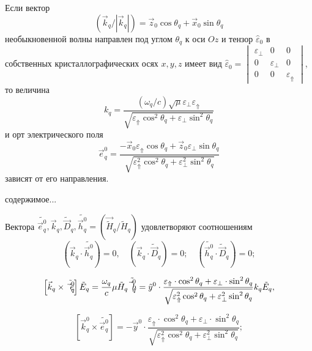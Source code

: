 \documentclass[a4paper]{article}
\begin{document}
 	\begin{minipage}{0.5\textwidth}
 		\begin{flushleft}
 			Если вектор 
 			$$\left(\vec{k}_{q}/\left|\vec{k}_{q}\right|\right)=\vec{z}_{0}\cos\theta_{q}+\vec{x}_{0}\sin\theta_{q}$$
 			необыкновенной волны направлен под углом $\theta_{q}$ к оси  $Oz$  и тензор $\hat{\varepsilon}_{0}$ в собственных кристаллографических осях  $x, y, z$ имеет вид 
 			$\hat{\varepsilon}_{0}=
 			\begin{vmatrix}
 				 \varepsilon_{\perp}& 0& 0\\
 				0& \varepsilon_{\perp}& 0\\
 				0& 0& \varepsilon_{\Uparrow}
 			\end{vmatrix}$, то величина
 		$$k_{q}=\frac{(\omega_{q}/c)\sqrt\mu\varepsilon_{\perp}\varepsilon_{\Uparrow}}{\sqrt{\varepsilon_{\Uparrow}\cos^{2}\theta_{q}+\varepsilon_{\perp}\sin^{2}\theta_{q}}}$$ и орт электрического поля $$\vec{e}_{q}^{0}=\frac{-\vec{x}_{0}\varepsilon_{\Uparrow}\cos\theta_{q}+\vec{z}_{0}\varepsilon_{\perp}\sin\theta_{q}}{\sqrt{\varepsilon_{\Uparrow}^{2}\cos^{2}\theta_{q}+\varepsilon_{\perp}^{2}\sin^{2}\theta_{q}}}$$ зависят от его направления.
 		\end{flushleft}
 	\end{minipage}
 	\begin{minipage}{0.5\textwidth}
 		\begin{flushright}
 			содержимое...
 		\end{flushright}
 	\end{minipage}
 	
 	Вектора $\tilde{\vec{e}^{0}_{q}},	 \vec{k}_{q},\tilde{\vec{D}}_{q},   \tilde{\vec{h}^{0}_{q}}=(\vec{\tilde{H}}_{q}/\tilde{H}_{q})$ удовлетворяют соотношениям 
 	$$\left(\vec{k}_{q}\cdot\tilde{\vec{h}^{0}_{q}}\right)=0,\quad\left(\vec{k}_{q}\cdot\tilde{\vec{D}}_{q}\right)=0;\quad\left(\tilde{\vec{h}^{0}_{q}}\cdot\tilde{\vec{D}}_{q}\right)=0;$$
 	
 	$$\left[\vec{k}_{q}\times\tilde{\vec{e}^{0}_{q}}\right]\tilde{E}_{q}=\frac{\omega_{q}}{c}\mu\tilde{H}_{q}\tilde{\vec{h}^{0}_{q}}=\-\tilde{y}^{0}\cdot\frac{\varepsilon_{\Uparrow}\cdot\cos^{2}\theta_{q}+\varepsilon_{\perp}\cdot\sin^{2}\theta_{q}}{\sqrt{\varepsilon_{\Uparrow}^{2}\cos^{2}\theta_{q}+\varepsilon_{\perp}^{2}\sin^{2}\theta_{q}}}k_{q}\tilde{E}_{q},$$
 	
 	$$\left[\vec{k}_{q}^{0}\times\tilde{\vec{e}^{0}_{q}}\right]=-\vec{y}^{0}\cdot\frac{\varepsilon_{\Uparrow}\cdot\cos^{2}\theta_{q}+\varepsilon_{\perp}\cdot\sin^{2}\theta_{q}}{\sqrt{\varepsilon_{\Uparrow}^{2}\cos^{2}\theta_{q}+\varepsilon_{\perp}^{2}\sin^{2}\theta_{q}}};$$
 	
\end{document}
